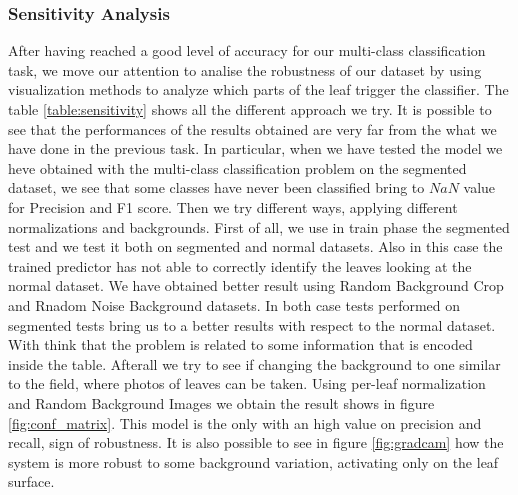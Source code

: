 \subsubsection{Sensitivity Analysis}
After having reached a good level of accuracy for our multi-class classification task, we move our attention to analise the robustness of our dataset by using visualization methods to analyze which parts of the leaf trigger the classifier. The table \ref{table:sensitivity} shows all the different approach we try. It is possible to see that the performances of the results obtained are very far from the what we have done in the previous task. In particular, when we have tested the model we heve obtained with the multi-class classification problem on the segmented dataset, we see that some classes have never been classified bring to $NaN$ value for Precision and F1 score. Then we try different ways, applying different normalizations and backgrounds. First of all, we use in train phase the segmented test and we test it both on segmented and normal datasets. Also in this case the trained predictor has not able to correctly identify the leaves looking at the normal dataset. We have obtained better result using Random Background Crop and Rnadom Noise Background datasets. In both case tests performed on segmented tests bring us to a better results with respect to the normal dataset. With think that the problem is related to some information that is encoded inside the table. Afterall we try to see if changing the background to one similar to the field, where photos of leaves can be taken. Using per-leaf normalization and Random Background Images we obtain the result shows in figure \ref{fig:conf_matrix}. This model is the only with an high value on precision and recall, sign of robustness. It is also possible to see in figure \ref{fig:gradcam} how the system is more robust to some background variation, activating only on the leaf surface.
